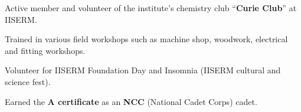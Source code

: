 {Active member and volunteer of the institute’s chemistry club “\textbf{Curie Club}” at IISERM.

Trained in various field workshops such as machine shop, woodwork, electrical and fitting workshops.

Volunteer for IISERM Foundation Day and Insomnia (IISERM cultural and science fest).

Earned the \textbf{A certificate} as an \textbf{NCC} (National Cadet Corps) cadet.

}
